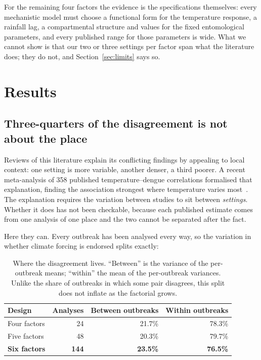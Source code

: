\documentclass[11pt,a4paper]{article}
\begin{document}
For the remaining four factors the evidence is the specifications themselves:
every mechanistic model must choose a functional form for the temperature
response, a rainfall lag, a compartmental structure and values for the fixed
entomological parameters, and every published range for those parameters is wide.
What we cannot show is that our two or three settings per factor span what the
literature does; they do not, and Section~\ref{sec:limits} says so.

\section{Results}

\subsection{Three-quarters of the disagreement is not about the place}
\label{sec:decomposition}

Reviews of this literature explain its conflicting findings by appealing to local
context: one setting is more variable, another denser, a third poorer. A recent
meta-analysis of 358 published temperature--dengue correlations formalised that
explanation, finding the association strongest where temperature varies
most~\cite{kirk2024}. The explanation requires the variation between studies to
sit between \emph{settings}. Whether it does has not been checkable, because each
published estimate comes from one analysis of one place and the two cannot be
separated after the fact.

Here they can. Every outbreak has been analysed every way, so the variation in
whether climate forcing is endorsed splits exactly:

\begin{table}[htbp]
\centering
\caption{Where the disagreement lives. ``Between'' is the variance of the
per-outbreak means; ``within'' the mean of the per-outbreak variances. Unlike the
share of outbreaks in which some pair disagrees, this split does not inflate as
the factorial grows.}
\begin{tabular}{lrrr}
\toprule
Design & Analyses & Between outbreaks & Within outbreaks \\
\midrule
Four factors & 24 & 21.7\% & 78.3\% \\
Five factors & 48 & 20.3\% & 79.7\% \\
\textbf{Six factors} & \textbf{144} & \textbf{23.5\%} & \textbf{76.5\%} \\
\bottomrule
\end{tabular}
\end{table}
\end{document}
